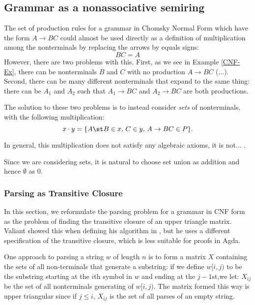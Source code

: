 \subsection{Grammar as a nonassociative semiring}
The set of production rules for a grammar in Chomsky Normal Form which have the form $A \to BC$ could almost be used directly as a definition of multiplication among the nonterminals by replacing the arrows by equals signs:
\begin{equation*}
  BC = A
\end{equation*}
However, there are two problems with this. First, as we see in Example \ref{CNF-Ex}, there can be nonterminals $B$ and $C$ with no production $A \to BC$ (...). Second, there can be many different nonterminals that expand to the same thing: there can be $A_1$ and $A_2$ such that $A_1 \to BC$ and $A_2 \to BC$ are both productions.

The solution to these two problems is to instead consider \emph{sets} of nonterminals, with the following multiplication:
\begin{equation*}
  x \cdot y = \{A \st B \in x,\, C \in y,\, A \to BC \in P\}.
\end{equation*}

In general, this multiplication does not satisfy any algebraic axioms, it is not... .

Since we are considering sets, it is natural to choose set union as addition and hence $\emptyset$ as $0$.
\subsubsection{Parsing as Transitive Closure}
In this section, we reformulate the parsing problem for a grammar in CNF form as the problem of finding the transitive closure of an upper triangle matrix.
Valiant showed this when defining his algorithm in \cite{Valiant}, but he uses a different specification of the transitive closure, which is  less suitable for proofs in Agda.

One approach to parsing a string $w$ of length $n$ is to form a matrix $X$ containing the sets of all non-terminals that generate a substring: if we define $w[i,j)$ to be the substring starting at the $i$th symbol in $w$ and ending at the $j-1$st,we let: $X_{i j}$ be the set of all nonterminals generating of $w[i,j)$. The matrix formed this way is upper triangular since if $j \le i$, $X_{i j}$ is the set of all parses of an empty string.

